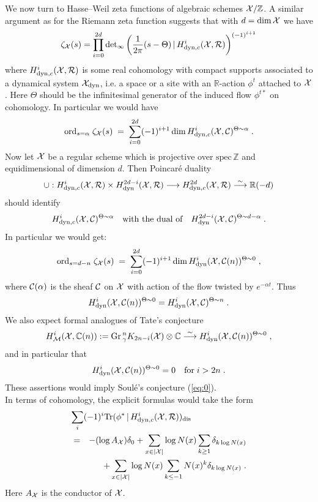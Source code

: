 \documentclass[11pt,leqno]{article}
\newcommand{\C}{{\mathbb{C}}}
\newcommand{\R}{{\mathbb{R}}}
\newcommand{\Z}{{\mathbb{Z}}}
\newcommand{\ddet}{\mathrm{det}}
\newcommand{\diss}{\mathrm{dis}}
\newcommand{\dyn}{\mathrm{dyn}}
\newcommand{\ord}{\mathrm{ord}}
\newcommand{\spec}{\mathrm{spec}\,}
\newcommand{\Gr}{\mathrm{Gr}\,}
\newcommand{\Tr}{\mathrm{Tr}}
\newcommand{\Ch}{{\cal C}}
\newcommand{\Mh}{{\cal M}}
\newcommand{\Rh}{{\cal R}}
\newcommand{\eX}{{\cal X}}
\newcommand{\silo}{\stackrel{\sim}{\longrightarrow}}
\newcommand{\tei}{\, | \,}
\begin{document}
We now turn to Hasse--Weil zeta functions of algebraic schemes $\eX / \Z$. A similar argument as for the Riemann zeta function suggests that with $d = \dim \eX$ we have
\begin{equation} \label{eq:6}
\zeta_{\eX} (s) = \prod^{2d}_{i=0} \ddet_{\infty} \left( \frac{1}{2 \pi} (s-\Theta) \tei H^i_{\dyn,c} ( \eX  , \Rh) \right)^{(-1)^{i+1}}
\end{equation}
where $H^i_{\dyn, c} ( \eX  , \Rh)$ is some real cohomology with compact supports associated to a dynamical system $\eX_{\dyn}$, i.e. a space or a site with an $\R$-action $\phi^t$ attached to $\eX$. Here $\Theta$ should be the infinitesimal generator of the induced flow $\phi^{t*}$ on cohomology. In particular we would have
\[
\ord_{s = \alpha} \; \zeta_{\eX} (s) \; = \; \sum^{2d}_{i=0} (-1)^{i+1} \dim H^i_{\dyn, c} ( \eX  , \Ch)^{\Theta \sim \alpha} \; .
\]
Now let $\eX$ be a regular scheme which is projective over $\spec \Z$ and equidimensional of dimension $d$. Then Poincar\'e duality
\begin{equation} \label{eq:7}
\cup : H^i_{\dyn, c} ( \eX  , \Rh) \times H^{2d-i}_{\dyn} ( \eX  , \Rh) \longrightarrow H^{2d}_{\dyn,c} ( \eX  , \Rh) \silo \R (-d)
\end{equation}
should identify 
\[
H^i_{\dyn, c} ( \eX  , \Ch)^{\Theta \sim \alpha} \quad \mbox{with the dual of} \quad H^{2d-i}_{\dyn} ( \eX  , \Ch)^{\Theta \sim d - \alpha} \; .
\]
In particular we would get:
\[
\ord_{s = d-n} \; \zeta_{\eX} (s) \; = \; \sum^{2d}_{i=0} (-1)^{i+1} \dim H^i_{\dyn} ( \eX  , \Ch (n))^{\Theta \sim 0} \; ,
\]
where $\Ch (\alpha)$ is the sheaf $\Ch$ on $ \eX $ with action of the flow twisted by $e^{-\alpha t}$. Thus
\[
H^i_{\dyn} ( \eX  , \Ch (n))^{\Theta \sim 0} = H^i_{\dyn} ( \eX  , \Ch)^{\Theta \sim n} \; .
\]
We also expect formal analogues of Tate's conjecture
\begin{equation}
  \label{eq:8}
  H^i_{\Mh} (\eX , \C (n)) := \Gr^n_{\gamma} K_{2n-i} (\eX) \otimes \C \silo H^i_{\dyn} ( \eX  , \Ch (n))^{\Theta \sim 0} \; ,
\end{equation}
and in particular that
\[
H^i_{\dyn} ( \eX  , \Ch (n))^{\Theta\sim 0} = 0 \quad \mbox{for} \; i > 2n \; .
\]
These assertions would imply Soul\'e's conjecture (\ref{eq:0}). \\
In terms of cohomology, the explicit formulas would take the form
\begin{eqnarray}
  \label{eq:9}
  \lefteqn{\sum_i (-1)^i \Tr (\phi^{\ast} \tei H^i_{\dyn, c} ( \eX  , \Rh))_{\diss} } \\ 
  & = & - (\log A_{\eX}) \delta_0 + \sum_{x \in |\eX|} \log N (x) \sum_{k\ge 1} \delta_{k \log N (x)} \nonumber \\
 & & + \sum_{x \in |\eX|} \log N (x) \sum_{k \le -1} N (x)^k \delta_{k \log N (x)} \nonumber  \; .
\end{eqnarray}
Here $A_{\eX}$ is the conductor of $\eX$.
\end{document}
